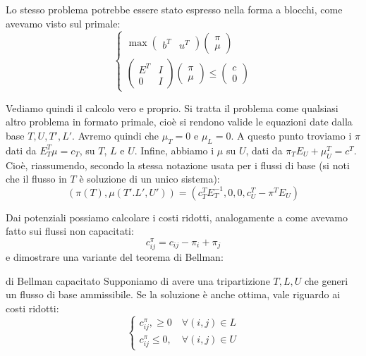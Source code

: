 \documentclass[a4paper,11pt]{article}
\begin{document}
Lo stesso problema potrebbe essere stato espresso nella forma a blocchi, come avevamo visto sul primale:
\[
	\begin{cases}
		\max 
		\begin{pmatrix}
			b^T & u^T
		\end{pmatrix}
		\begin{pmatrix}
			\pi \\ \mu
		\end{pmatrix}\\
		\begin{pmatrix}
			E^T & I \\ 
			0 & I
		\end{pmatrix}
		\begin{pmatrix}
			\pi \\ \mu
		\end{pmatrix}
			\leq
		\begin{pmatrix}
			c \\ 0
		\end{pmatrix}
	\end{cases}
\]

Vediamo quindi il calcolo vero e proprio.
Si tratta il problema come qualsiasi altro problema in formato primale, cioè si rendono valide le equazioni date dalla base $T, U, T', L'$.
Avremo quindi che $\mu_T = 0$ e $\mu_L = 0$.
A questo punto troviamo i $\pi$ dati da $E_T^T \mu = c_T$, su $T$, $L$ e $U$.
Infine, abbiamo i $\mu$ su $U$, dati da $\pi_T E_U + \mu_U^T = c^T$.
Cioè, riassumendo, secondo la stessa notazione usata per i flussi di base (si noti che il flusso in $T$ è soluzione di un unico sistema):
$$
(\pi(T), \mu(T'. L', U')) = \left(c_T^T E_T^{-1}, 0, 0, c_U^T - \pi^T E_U \right)
$$

Dai potenziali possiamo calcolare i costi ridotti, analogamente a come avevamo fatto sui flussi non capacitati:
$$
c^\pi_{ij} = c_{ij} - \pi_i + \pi_j
$$
e dimostrare una variante del teorema di Bellman:

\begin{theorem}{di Bellman capacitato}
	Supponiamo di avere una tripartizione $T, L, U$ che generi un flusso di base ammissibile.
	Se la soluzione è anche ottima, vale riguardo ai costi ridotti:
	\[
		\begin{cases}
			c_ {ij}^\pi, \geq 0 \quad \forall (i,j) \in L \\ 
			c_ {ij}^\pi \leq 0, \quad \forall (i,j) \in U
		\end{cases}
	\]	
\end{theorem}
\end{document}

